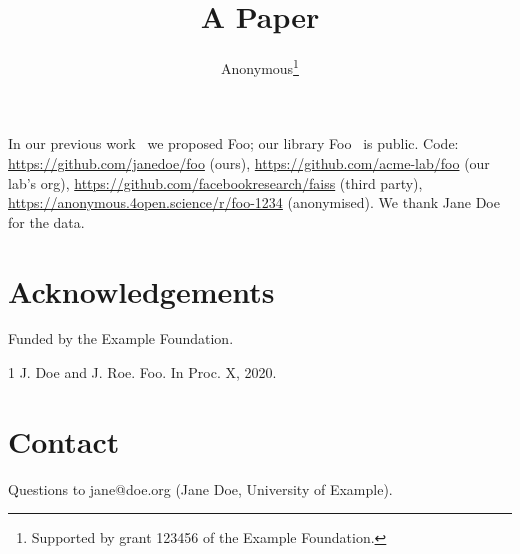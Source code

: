 \documentclass{article}
\title{A Paper}
\author{Anonymous\thanks{Supported by grant 123456 of the Example Foundation.}}
\begin{document}
\maketitle
In our previous work~\cite{doe2020} we proposed Foo; our library Foo~\cite{doe2020} is public.
Code: \url{https://github.com/janedoe/foo} (ours), \url{https://github.com/acme-lab/foo} (our lab's org),
\url{https://github.com/facebookresearch/faiss} (third party), \url{https://anonymous.4open.science/r/foo-1234} (anonymised).
We thank Jane Doe for the data.
\section*{Acknowledgements}
Funded by the Example Foundation.
\begin{thebibliography}{1}
 J. Doe and J. Roe. Foo. In Proc. X, 2020.
\end{thebibliography}
\appendix
\section{Contact}
Questions to jane@doe.org (Jane Doe, University of Example).
\end{document}
